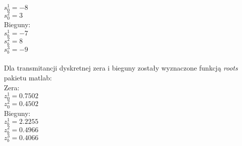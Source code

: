 \documentclass[a4paper, 11pt]{article}
\begin{document}
$s_0^1 = -8$\\

$s_0^2 = 3$\\

\noindent Bieguny: \\

$s_b^1 = -7$\\

$s_b^2 = 8$\\

$s_b^3 = -9$\\
\\
Dla transmitancji dyskretnej zera i bieguny zostały wyznaczone funkcją \emph{roots} pakietu matlab:\\ 
Zera:\\

$z_0^1=0.7502$\\

$z_0^2=0.4502$\\

\noindent Bieguny:\\

$z_b^1 = 2.2255$\\

$z_b^2 =0.4966$\\

$z_b^3 =0.4066$














      
\end{document}
